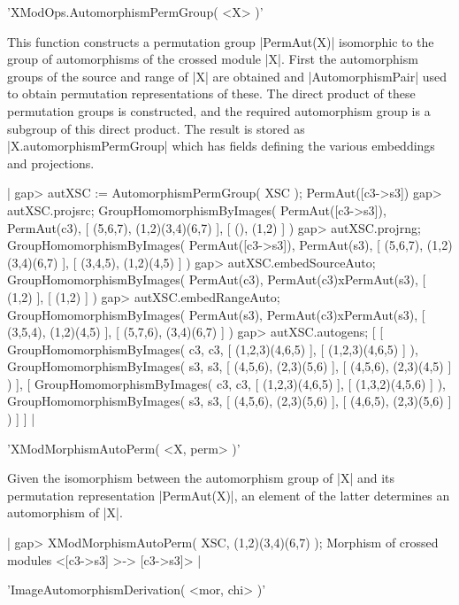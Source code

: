 {'XModOps.AutomorphismPermGroup( <X> )'

This function constructs a permutation group |PermAut(X)| isomorphic 
to the group of automorphisms of the crossed module |X|.
First the automorphism groups of the source and range of |X| are obtained
and |AutomorphismPair| used to obtain permutation representations 
of these.  The direct product of these permutation groups is constructed,
and the required automorphism group is a subgroup of this direct product.
The result is stored as  |X.automorphismPermGroup|  which has
fields defining the various embeddings and projections.

|    gap> autXSC := AutomorphismPermGroup( XSC );
    PermAut([c3->s3])
    gap> autXSC.projsrc;
    GroupHomomorphismByImages( PermAut([c3->s3]), PermAut(c3), 
    [ (5,6,7), (1,2)(3,4)(6,7) ], [ (), (1,2) ] )
    gap> autXSC.projrng;
    GroupHomomorphismByImages( PermAut([c3->s3]), PermAut(s3), 
    [ (5,6,7), (1,2)(3,4)(6,7) ], [ (3,4,5), (1,2)(4,5) ] )
    gap> autXSC.embedSourceAuto;
    GroupHomomorphismByImages( PermAut(c3), PermAut(c3)xPermAut(s3),
        [ (1,2) ], [ (1,2) ] )
    gap> autXSC.embedRangeAuto;
    GroupHomomorphismByImages( PermAut(s3), PermAut(c3)xPermAut(s3), 
    [ (3,5,4), (1,2)(4,5) ], [ (5,7,6), (3,4)(6,7) ] )
    gap> autXSC.autogens;
    [ [ GroupHomomorphismByImages( c3, c3, [ (1,2,3)(4,6,5) ],
            [ (1,2,3)(4,6,5) ] ), GroupHomomorphismByImages( s3, s3, 
            [ (4,5,6), (2,3)(5,6) ], [ (4,5,6), (2,3)(4,5) ] ) ], 
      [ GroupHomomorphismByImages( c3, c3, [ (1,2,3)(4,6,5) ], 
            [ (1,3,2)(4,5,6) ] ), GroupHomomorphismByImages( s3, s3, 
            [ (4,5,6), (2,3)(5,6) ], [ (4,6,5), (2,3)(5,6) ] ) ] ]   |

%

'XModMorphismAutoPerm( <X, perm> )'

Given the isomorphism between the automorphism group of |X| and its
permutation representation |PermAut(X)|, an element of the latter
determines an automorphism of |X|.

|    gap> XModMorphismAutoPerm( XSC, (1,2)(3,4)(6,7) );
    Morphism of crossed modules <[c3->s3] >-> [c3->s3]>  |

%

'ImageAutomorphismDerivation( <mor, chi> )'

}
